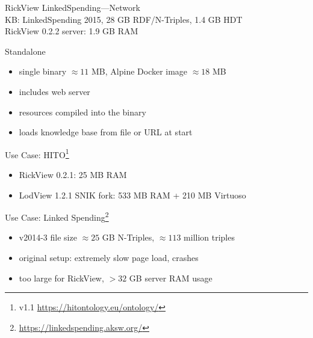 \documentclass[14pt,aspectratio=169]{beamer}
\begin{document}
\begin{frame}[plain]{RickView LinkedSpending---Network}
\centering{}\\
\hspace{2em}
\centering{}
KB: LinkedSpending 2015, 28 GB RDF/N-Triples, 1.4 GB HDT\\
RickView 0.2.2 server: 1.9 GB RAM
\end{frame}

\iffalse
\begin{frame}{Standalone}
\begin{itemize}
\item single binary $\approx 11$ MB, Alpine Docker image $\approx 18$ MB
\item includes web server
\item resources compiled into the binary
\item loads knowledge base from file or URL at start
\end{itemize}
\end{frame}

\begin{frame}{Use Case: HITO\footnote{v1.1 \url{https://hitontology.eu/ontology/}}}
\begin{itemize}
\item RickView 0.2.1: 25 MB RAM
\item LodView 1.2.1 SNIK fork: 533 MB RAM + 210 MB Virtuoso
\end{itemize}
\end{frame}

\begin{frame}{Use Case: Linked Spending\footnote{\url{https://linkedspending.aksw.org/}}}
\begin{itemize}
\item v2014-3 file size $\approx 25$ GB N-Triples, $\approx 113$ million triples
\item original setup: extremely slow page load, crashes
\item too large for RickView, $> 32$ GB server RAM usage
\end{itemize}
\end{frame}
\end{document}
